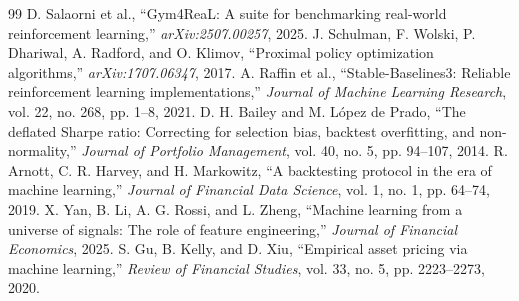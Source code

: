 \documentclass[conference]{IEEEtran}
\begin{document}
\begin{thebibliography}{99}
 D. Salaorni et al., ``Gym4ReaL: A suite for benchmarking real-world reinforcement learning,'' \textit{arXiv:2507.00257}, 2025.
 J. Schulman, F. Wolski, P. Dhariwal, A. Radford, and O. Klimov, ``Proximal policy optimization algorithms,'' \textit{arXiv:1707.06347}, 2017.
 A. Raffin et al., ``Stable-Baselines3: Reliable reinforcement learning implementations,'' \textit{Journal of Machine Learning Research}, vol. 22, no. 268, pp. 1--8, 2021.
 D. H. Bailey and M. L\'opez de Prado, ``The deflated Sharpe ratio: Correcting for selection bias, backtest overfitting, and non-normality,'' \textit{Journal of Portfolio Management}, vol. 40, no. 5, pp. 94--107, 2014.
 R. Arnott, C. R. Harvey, and H. Markowitz, ``A backtesting protocol in the era of machine learning,'' \textit{Journal of Financial Data Science}, vol. 1, no. 1, pp. 64--74, 2019.
 X. Yan, B. Li, A. G. Rossi, and L. Zheng, ``Machine learning from a universe of signals: The role of feature engineering,'' \textit{Journal of Financial Economics}, 2025.
 S. Gu, B. Kelly, and D. Xiu, ``Empirical asset pricing via machine learning,'' \textit{Review of Financial Studies}, vol. 33, no. 5, pp. 2223--2273, 2020.
\end{thebibliography}
\end{document}
